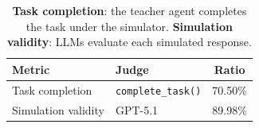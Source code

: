 \begin{table}[t]
\centering
\small
\setlength{\tabcolsep}{4pt}
\begin{tabular*}{\linewidth}{@{\extracolsep{\fill}}llc@{}}
\toprule
\textbf{Metric} & \textbf{Judge} & \textbf{Ratio} \\
\midrule
Task completion 
& \texttt{complete\_task()} 
& 70.50\% \\
\midrule
Simulation validity
& GPT-5.1
& 89.98\% \\
\bottomrule
\end{tabular*}
\caption{\textbf{Task completion}: the teacher agent completes the task under the simulator.
\textbf{Simulation validity}: LLMs evaluate each simulated response.}
\label{tab:simulator-quality}
\end{table}